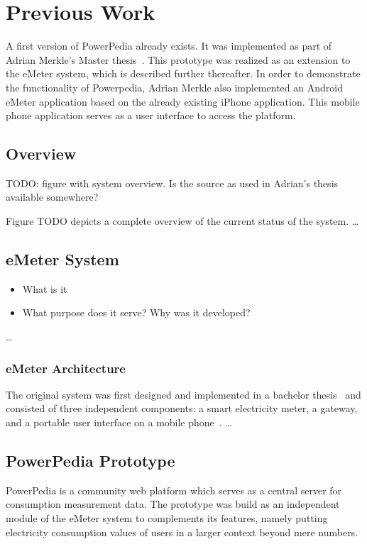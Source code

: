 \section{Previous Work} \label{sec:previous_work}
A first version of PowerPedia already exists. It was implemented as part of Adrian Merkle's Master thesis~\cite{merklepp}. This prototype was realized as an extension to the eMeter system, which is described further thereafter.
In order to demonstrate the functionality of Powerpedia, Adrian Merkle also implemented an Android eMeter application based on the already existing iPhone application. This mobile phone application serves as a user interface to access the platform.

\subsection{Overview}
TODO: figure with system overview. Is the source as used in Adrian's thesis available somewhere?

Figure TODO depicts a complete overview of the current status of the system. 
\dots

\subsection{eMeter System}
\begin{itemize}
 \item What is it
 \item What purpose does it serve? Why was it developed?
\end{itemize}

\dots
\subsubsection{eMeter Architecture}\label{sec:emeter_architecture}
The original system was first designed and implemented in a bachelor thesis~\cite{roediger} and consisted of three independent components: a smart electricity meter, a gateway, and a portable user interface on a mobile phone~\cite{weissm:inprocMUM:2009}. 
\dots




\subsection{PowerPedia Prototype}
PowerPedia is a community web platform which serves as a central server for consumption measurement data. The prototype was build as an independent module of the eMeter system to complements its features, namely putting electricity consumption values of users in a larger context beyond mere numbers.

